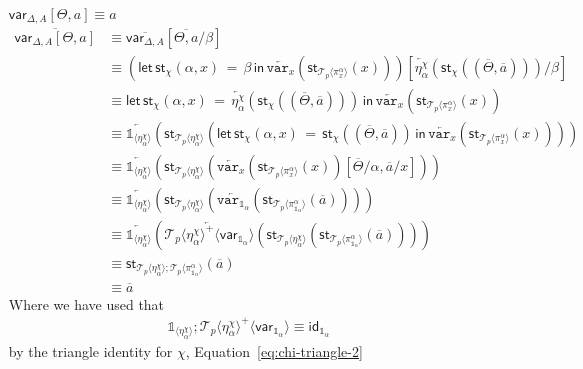 \documentclass[10pt]{article}
\theoremstyle{definition}
\newcommand{\id}{\mathsf{id}}
\newcommand{\rewrite}[2]{\overleftarrow{#1}(#2)}
\newcommand\StI[2]{\ensuremath{\mathsf{st}_{#1}(#2)}}
\newcommand\StE[4]{\ensuremath{\mathsf{let} \, \StI{#1}{#3} \, = \, {#2} \, \mathsf{in} \, #4}}
\newcommand\ApEl[2]{\mathcal{T}_{#1}\langle#2\rangle}
\newcommand\ApPlus[2]{\ensuremath{{#1}^+ \langle #2 \rangle }}
\newcommand{\upstairs}[1]{\overline{#1}}
\newcommand\qvar[1]{\ensuremath{\mathsf{var}_{#1}}}
\newcommand\One{\ensuremath{\mathds{1}}}
\newcommand\var[1]{\ensuremath{\mathtt{var}_{#1}}}
\newcommand\ApOne[1]{\ensuremath{\One_{\langle {#1} \rangle }}}
\begin{document}
\begin{enumerate}[style = multiline, labelwidth = 80pt]
\item[{$\qvar{\Delta,A}[\Theta, a] \equiv a$}] 
\begin{align*}
\upstairs{\qvar{\Delta,A}[\Theta, a]} 
&\equiv \upstairs{\qvar{\Delta,A}}[\upstairs{\Theta, a}/\beta] \\
&\equiv (\StE{\chi}{\beta}{\alpha, x}{\rewrite{\var{x}}{\StI{\ApEl{p}{\pi^{\alpha}_{x}}}{x}}})[\rewrite{\eta^\chi_{\alpha}}{\StI{\chi}{(\upstairs{\Theta}, \upstairs{a})}}/\beta] \\
&\equiv \StE{\chi}{\rewrite{\eta^\chi_{\alpha}}{\StI{\chi}{(\upstairs{\Theta}, \upstairs{a})}}}{\alpha, x}{\rewrite{\var{x}}{\StI{\ApEl{p}{\pi^{\alpha}_{x}}}{x}}} \\
&\equiv \rewrite{\One_{\langle \eta^\chi_\alpha \rangle}}{\StI{\ApEl{p}{\eta^\chi_\alpha}}{\StE{\chi}{\StI{\chi}{(\upstairs{\Theta}, \upstairs{a})}}{\alpha, x}{\rewrite{\var{x}}{\StI{\ApEl{p}{\pi^{\alpha}_{x}}}{x}}}}} \\
&\equiv \rewrite{\One_{\langle \eta^\chi_\alpha \rangle}}{\StI{\ApEl{p}{\eta^\chi_\alpha}}{\rewrite{\var{x}}{\StI{\ApEl{p}{\pi^{\alpha}_{x}}}{x}}[\upstairs{\Theta}/\alpha, \upstairs{a}/x]}} \\
&\equiv \rewrite{\One_{\langle \eta^\chi_\alpha \rangle}}{\StI{\ApEl{p}{\eta^\chi_\alpha}}{\rewrite{\var{\One_\alpha}}{\StI{\ApEl{p}{\pi^{\alpha}_{\One_\alpha}}}{\upstairs{a}}}}} \\
&\equiv \rewrite{\One_{\langle \eta^\chi_\alpha \rangle}}{\rewrite{\ApPlus{\ApEl{p}{\eta^\chi_\alpha}}{\qvar{\One_\alpha}}}{\StI{\ApEl{p}{\eta^\chi_\alpha}}{\StI{\ApEl{p}{\pi^{\alpha}_{\One_\alpha}}}{\upstairs{a}}}}} \\
&\equiv \StI{\ApEl{p}{\eta^\chi_\alpha};\ApEl{p}{\pi^{\alpha}_{\One_\alpha}}}{\upstairs{a}} \\
&\equiv \upstairs{a}
\end{align*}
Where we have used that
\begin{align*}
\ApOne{\eta^\chi_\alpha};\ApPlus{\ApEl{p}{\eta^\chi_\alpha}}{\qvar{\One_\alpha}} \equiv \id_{\One_\alpha}
\end{align*}
by the triangle identity for $\chi$, Equation~\eqref{eq:chi-triangle-2}


\end{enumerate}
\end{document}
